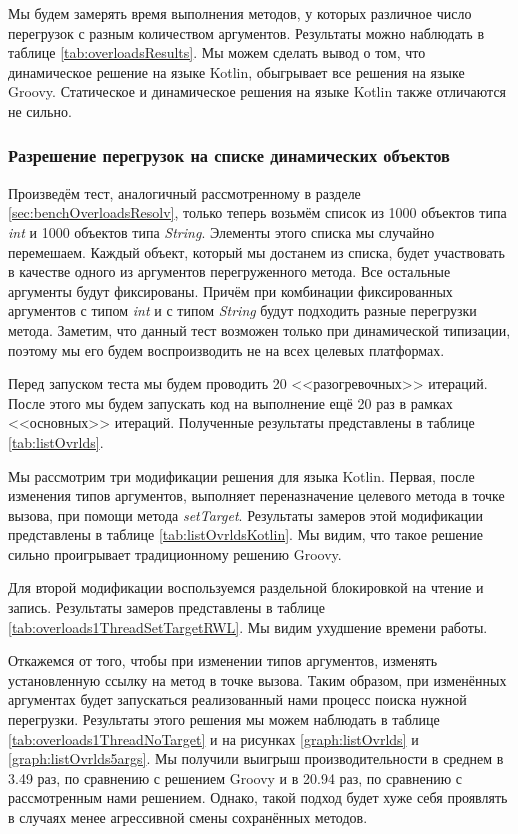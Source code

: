 Мы будем замерять время выполнения методов, у которых различное число перегрузок с разным количеством аргументов. Результаты можно наблюдать в таблице  \ref{tab:overloadsResults}. Мы можем сделать вывод о том, что динамическое решение на языке Kotlin, обыгрывает все решения на языке Groovy. Статическое и динамическое решения на языке Kotlin также отличаются не сильно.

\subsubsection{Разрешение перегрузок на списке динамических объектов}
\label{sec:listDynObjects}

Произведём тест, аналогичный рассмотренному в разделе \ref{sec:benchOverloadsResolv}, только теперь возьмём список из 1000 объектов типа \textit{int} и 1000 объектов типа \textit{String}. Элементы этого списка мы случайно перемешаем. Каждый объект, который мы достанем из списка, будет участвовать в качестве одного из аргументов перегруженного метода. Все остальные аргументы будут фиксированы. Причём при комбинации фиксированных аргументов с типом \textit{int} и с типом \textit{String} будут подходить разные перегрузки метода. Заметим, что данный тест возможен только при динамической типизации, поэтому мы его будем воспроизводить не на всех целевых платформах.

Перед запуском теста мы будем проводить 20 <<разогревочных>> итераций. После этого мы будем запускать код на выполнение ещё 20 раз в рамках <<основных>> итераций. Полученные результаты представлены в таблице \ref{tab:listOvrlds}.

Мы рассмотрим три модификации решения для языка Kotlin. Первая, после изменения типов аргументов, выполняет переназначение целевого метода в точке вызова, при помощи метода \textit{setTarget}. Результаты замеров этой модификации представлены в таблице \ref{tab:listOvrldsKotlin}. Мы видим, что такое решение сильно проигрывает традиционному решению Groovy. 

Для второй модификации воспользуемся раздельной блокировкой на чтение и запись\footnotemark. Результаты замеров представлены в таблице \ref{tab:overloads1ThreadSetTargetRWL}. Мы видим ухудшение времени работы.



Откажемся от того, чтобы при изменении типов аргументов, изменять установленную ссылку на метод в точке вызова. Таким образом, при изменённых аргументах будет запускаться реализованный нами процесс поиска нужной перегрузки.
Результаты этого решения мы можем наблюдать в таблице  \ref{tab:overloads1ThreadNoTarget} и на рисунках \ref{graph:listOvrlds} и \ref{graph:listOvrlds5args}. Мы получили выигрыш производительности в среднем в 3.49 раз, по сравнению с решением Groovy и в 20.94 раз, по сравнению с рассмотренным нами решением. Однако, такой подход будет хуже себя проявлять в случаях менее агрессивной смены сохранённых методов.

